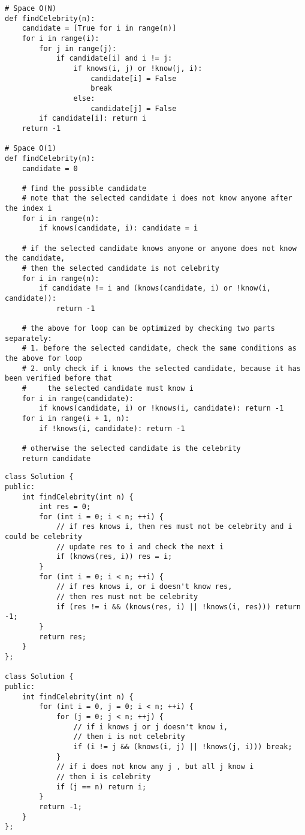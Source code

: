 \begin{lstlisting}
# Space O(N)
def findCelebrity(n):
	candidate = [True for i in range(n)]
	for i in range(i):
		for j in range(j):
			if candidate[i] and i != j:
				if knows(i, j) or !know(j, i):
					candidate[i] = False
					break
				else:
					candidate[j] = False
		if candidate[i]: return i
	return -1

# Space O(1)
def findCelebrity(n):
	candidate = 0
	
	# find the possible candidate
	# note that the selected candidate i does not know anyone after the index i
	for i in range(n):
		if knows(candidate, i): candidate = i
	
	# if the selected candidate knows anyone or anyone does not know the candidate, 
	# then the selected candidate is not celebrity 
	for i in range(n):
		if candidate != i and (knows(candidate, i) or !know(i, candidate)): 
			return -1
	
	# the above for loop can be optimized by checking two parts separately:
	# 1. before the selected candidate, check the same conditions as the above for loop
	# 2. only check if i knows the selected candidate, because it has been verified before that
	#     the selected candidate must know i
	for i in range(candidate):
		if knows(candidate, i) or !knows(i, candidate): return -1
	for i in range(i + 1, n):
		if !knows(i, candidate): return -1
	
	# otherwise the selected candidate is the celebrity
	return candidate
\end{lstlisting}

\begin{lstlisting}
class Solution {
public:
    int findCelebrity(int n) {
        int res = 0;
        for (int i = 0; i < n; ++i) {
            // if res knows i, then res must not be celebrity and i could be celebrity
            // update res to i and check the next i
            if (knows(res, i)) res = i;
        }
        for (int i = 0; i < n; ++i) {
            // if res knows i, or i doesn't know res,
            // then res must not be celebrity
            if (res != i && (knows(res, i) || !knows(i, res))) return -1;
        }
        return res;
    }
};

class Solution {
public:
    int findCelebrity(int n) {
        for (int i = 0, j = 0; i < n; ++i) {
            for (j = 0; j < n; ++j) {
                // if i knows j or j doesn't know i,
                // then i is not celebrity
                if (i != j && (knows(i, j) || !knows(j, i))) break;
            }
            // if i does not know any j , but all j know i
            // then i is celebrity
            if (j == n) return i;
        }
        return -1;
    }
};
\end{lstlisting}


